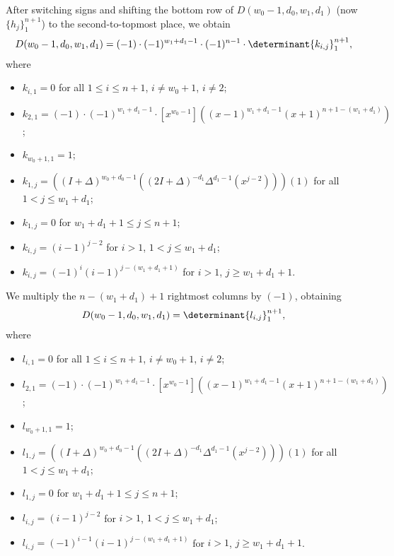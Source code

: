 \documentclass[10pt,reqno]{amsart}
\theoremstyle{plain}
\theoremstyle{definition}
\theoremstyle{remark}
\begin{document}
After switching signs and shifting the bottom row of
$D(w_0-1,d_0,w_1,d_1)$ (now  $\{h_j\}_1^{n+1}$) to the second-to-topmost
place, we obtain
\begin{equation}
D(w_0-1,d_0,w_1,d_1) = 
(-1)\cdot (-1)^{w_1+d_1-1}\cdot (-1)^{n-1}\cdot
\determinant{k_{i,j}}_1^{n+1},
\end{equation}
where 
\begin{itemize}
\item $k_{i,1} = 0$ for all $1\leq i\leq n+1$, $i\ne w_0+1$, $i\ne 2$;
\item $k_{2,1} = (-1)\cdot (-1)^{w_1+d_1-1}\cdot
[x^{w_0-1}]((x-1)^{w_1+d_1-1} (x+1)^{n+1-(w_1+d_1)})$;
\item $k_{w_0+1,1} = 1$;
\item $k_{1,j} = 
((I+\Delta)^{w_0+d_0-1}((2I+\Delta)^{-d_1}\Delta^{d_1-1}(x^{j-2})))(1)$
for all $1<j\leq w_1+d_1$;
\item $k_{1,j} = 0$ for $w_1+d_1+1\leq j\leq n+1$;
\item $k_{i,j} = (i-1)^{j-2}$ for $i>1$, $1<j\leq w_1+d_1$;
\item $k_{i,j} = (-1)^i (i-1)^{j-(w_1+d_1+1)}$ for $i>1$, $j\geq w_1+d_1+1$.
\end{itemize}

We multiply the $n-(w_1+d_1)+1$ rightmost columns by $(-1)$, obtaining
\begin{equation}
D(w_0-1,d_0,w_1,d_1) = \determinant{l_{i,j}}_1^{n+1},
\end{equation}
where
\begin{itemize}
\item $l_{i,1} = 0$ for all $1\leq i\leq n+1$, $i\ne w_0+1$, $i\ne 2$;
\item $l_{2,1} = (-1)\cdot (-1)^{w_1+d_1-1}\cdot
[x^{w_0-1}]((x-1)^{w_1+d_1-1} (x+1)^{n+1-(w_1+d_1)})$;
\item $l_{w_0+1,1} = 1$;
\item $l_{1,j} = 
((I+\Delta)^{w_0+d_0-1}((2I+\Delta)^{-d_1}\Delta^{d_1-1}(x^{j-2})))(1)$
for all $1<j\leq w_1+d_1$;
\item $l_{1,j} = 0$ for $w_1+d_1+1\leq j\leq n+1$;
\item $l_{i,j} = (i-1)^{j-2}$ for $i>1$, $1<j\leq w_1+d_1$;
\item $l_{i,j} = (-1)^{i-1} (i-1)^{j-(w_1+d_1+1)}$ for $i>1$, $j\geq w_1+d_1+1$.
\end{itemize}
\end{document}
